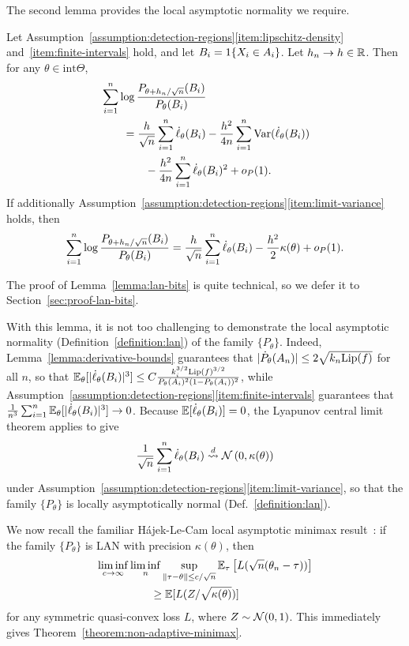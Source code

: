 The second lemma provides the local asymptotic normality we require.
\begin{lemma}
  \label{lemma:lan-bits}
  Let
  Assumption~\ref{assumption:detection-regions}\eqref{item:lipschitz-density}
  and~\eqref{item:finite-intervals} hold, and let $B_i = 1\!\left\{X_i \in
    A_i\right\}$.  Let $h_n \to h \in \mathbb{R}$. Then for any $\theta \in
  \mbox{int}\Theta$,
  \begin{align*}
    & \sum_{i = 1}^n \log \frac{P_{\theta + h_n/\sqrt{n}}(B_i)}{
      P_\theta(B_i)} \\
    & \qquad = \frac{h}{\sqrt{n}}
    \sum_{i = 1}^n \dot{\ell}_\theta(B_i) - \frac{h^2}{4n} \sum_{i = 1}^n \textup{Var}(\dot{\ell}_\theta(B_i)) \\
    & \qquad \qquad - \frac{h^2}{4n} \sum_{i = 1}^n \dot{\ell}_\theta(B_i)^2
    + o_P(1).
  \end{align*}
  If additionally
  Assumption~\ref{assumption:detection-regions}\eqref{item:limit-variance}
  holds, then
  \begin{equation*}
    \sum_{i = 1}^n \log \frac{P_{\theta + h_n/\sqrt{n}}(B_i)}{
      P_\theta(B_i)}
    = \frac{h}{\sqrt{n}}
    \sum_{i = 1}^n \dot{\ell}_\theta(B_i)
    - \frac{h^2}{2} \kappa(\theta) + o_P(1).
  \end{equation*}
\end{lemma}
\noindent
The proof of Lemma~\ref{lemma:lan-bits} is quite technical,
so we defer it to Section~\ref{sec:proof-lan-bits}.

With this lemma, it is not too challenging to demonstrate the local
asymptotic normality (Definition~\ref{definition:lan}) of the family
$\{P_\theta\}$. Indeed, Lemma~\ref{lemma:derivative-bounds} guarantees that
$|\dot{P}_\theta(A_n)| \le 2\sqrt{k_n {\rm \textup{Lip}}(f)}$ for all $n$, so that
$\mathbb{E}_\theta[|\dot{\ell}_\theta(B_i)|^3] \le C \frac{k_i^{3/2}
  {\rm \textup{Lip}}(f)^{3/2}}{P_\theta(A_i)^2 (1 - P_\theta(A_i))^2}$, while
Assumption~\ref{assumption:detection-regions}\eqref{item:finite-intervals}
guarantees that
$\frac{1}{n^3} \sum_{i = 1}^n \mathbb{E}_\theta[|\dot{\ell}_\theta(B_i)|^3]
\to 0$. Because $\mathbb{E}[\dot{\ell}_\theta(B_i)] = 0$,
the Lyapunov central limit theorem
applies to give
\begin{equation*}
  \frac{1}{\sqrt{n}} \sum_{i = 1}^n \dot{\ell}_\theta(B_i)
  \stackrel{d}{\rightsquigarrow} \mathcal{N}\left(0, \kappa(\theta)\right)
\end{equation*}
under
Assumption~\ref{assumption:detection-regions}\eqref{item:limit-variance},
so that the family $\{P_\theta\}$ is locally asymptotically normal
(Def.~\ref{definition:lan}).

We now recall the familiar H\'{a}jek-Le-Cam local asymptotic minimax
result~\cite[Thm.~8.11]{VanDerVaart98}: if the family
$\{P_\theta\}$ is LAN with precision $\kappa(\theta)$, then
\begin{align*}
  \liminf_{c \to \infty} & \liminf_n \sup_{\left\|{\tau - \theta}\right\| \le
    c / \sqrt{n}} \mathbb{E}_\tau\left[L(\sqrt{n}(\theta_n - \tau))\right] \\
  & \qquad  \ge \mathbb{E}[L(Z / \sqrt{\kappa(\theta)})]
\end{align*}
for any symmetric quasi-convex loss $L$, where $Z \sim \mathcal{N}(0, 1)$.
This immediately gives Theorem~\ref{theorem:non-adaptive-minimax}.

